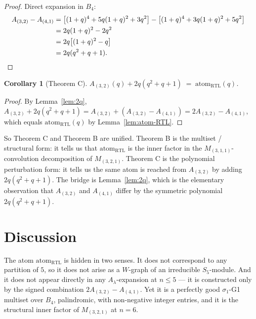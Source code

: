 \documentclass[11pt]{article}
\newtheorem{corollary}[theorem]{Corollary}
\theoremstyle{definition}
\begin{document}
\begin{proof}
Direct expansion in $B_4$:
\begin{align*}
A_{(3,2)} - A_{(4,1)} &= \bigl[(1+q)^4 + 5q(1+q)^2 + 3q^2\bigr] - \bigl[(1+q)^4 + 3q(1+q)^2 + 5q^2\bigr]\\
&= 2q(1+q)^2 - 2q^2 \\
&= 2q\bigl[(1+q)^2 - q\bigr]\\
&= 2q(q^2 + q + 1). \qedhere
\end{align*}
\end{proof}

\begin{corollary}[Theorem C]\label{cor:thm-C}
$A_{(3,2)}(q) + 2q(q^2 + q + 1) \;=\; \mathrm{atom}_{\mathrm{RTL}}(q)$.
\end{corollary}

\begin{proof}
By Lemma~\ref{lem:2q}, $A_{(3,2)} + 2q(q^2+q+1) = A_{(3,2)} + (A_{(3,2)} - A_{(4,1)}) = 2 A_{(3,2)} - A_{(4,1)}$, which equals $\mathrm{atom}_{\mathrm{RTL}}(q)$ by Lemma~\ref{lem:atom-RTL}.
\end{proof}

So Theorem C and Theorem B are unified. Theorem B is the multiset / structural form: it tells us that $\mathrm{atom}_{\mathrm{RTL}}$ is the inner factor in the $M_{(3,1,1)}$-convolution decomposition of $M_{(3,2,1)}$. Theorem C is the polynomial perturbation form: it tells us the same atom is reached from $A_{(3,2)}$ by adding $2q(q^2+q+1)$. The bridge is Lemma~\ref{lem:2q}, which is the elementary observation that $A_{(3,2)}$ and $A_{(4,1)}$ differ by the symmetric polynomial $2q(q^2+q+1)$.

\section{Discussion}

The atom $\mathrm{atom}_{\mathrm{RTL}}$ is hidden in two senses. It does not correspond to any partition of $5$, so it does not arise as a $W$-graph of an irreducible $S_5$-module. And it does not appear directly in any $A_\lambda$-expansion at $n \leq 5$ — it is constructed only by the signed combination $2 A_{(3,2)} - A_{(4,1)}$. Yet it is a perfectly good $\sigma_1$-G1 multiset over $B_4$, palindromic, with non-negative integer entries, and it is the structural inner factor of $M_{(3,2,1)}$ at $n = 6$.
\end{document}

